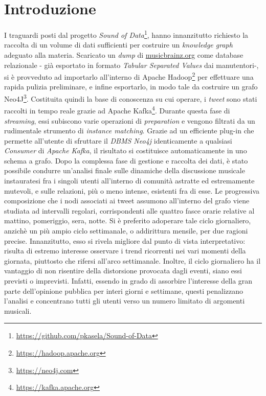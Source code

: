 \documentclass[12pt, a4paper, twocolumn]{article} %
\begin{document}
\part{Introduzione}
I traguardi posti dal progetto \textit{Sound of Data}\footnote{\url{https://github.com/pkasela/Sound-of-Data}}, hanno innanzitutto richiesto la raccolta di un volume di dati sufficienti per costruire un \textit{knowledge graph} adeguato alla materia. Scaricato un \textit{dump} di \url{musicbrainz.org} come database relazionale - già esportato in formato \textit{Tabular Separated Values} dai manutentori-, si è provveduto ad importarlo all'interno di Apache Hadoop\footnote{\url{https://hadoop.apache.org}} per effettuare una rapida pulizia preliminare, e infine esportarlo, in modo tale da costruire un grafo Neo4J\footnote{\url{https://neo4j.com}}.
Costituita quindi la base di conoscenza su cui operare, i \textit{tweet} sono stati raccolti in tempo reale grazie ad Apache Kafka\footnote{\url{https://kafka.apache.org}}. Durante questa fase di \textit{streaming}, essi subiscono varie operazioni di \textit{preparation} e vengono filtrati da un rudimentale strumento di \textit{instance matching}. Grazie ad un efficiente plug-in che permette all'utente di sfruttare il \textit{DBMS Neo4j} identicamente a qualsiasi \textit{Consumer} di \textit{Apache Kafka}, il risultato si costituisce automaticamente in uno schema a grafo. Dopo la complessa fase di gestione e raccolta dei dati, è stato possibile condurre un'analisi finale sulle dinamiche della discussione musicale instauratesi fra i singoli utenti all'interno di comunità astratte ed estremamente mutevoli, e sulle relazioni, più o meno intense, esistenti fra di esse. Le progressiva composizione che i nodi associati ai tweet assumono all'interno del grafo viene studiata ad intervalli regolari, corrispondenti alle quattro fasce orarie relative al mattino, pomeriggio, sera, notte. Si è preferito adoperare tale ciclo giornaliero, anzichè un più ampio ciclo settimanale, o addirittura mensile, per due ragioni precise. Innanzitutto, esso si rivela migliore dal punto di vista interpretativo: risulta di estremo interesse osservare i trend ricorrenti nei vari momenti della giornata, piuttosto che rifersi all'arco settimanale. Inoltre, il ciclo giornaliero ha il vantaggio di non risentire della distorsione provocata dagli eventi, siano essi previsti o imprevisti. Infatti, essendo in grado di assorbire l'interesse della gran parte dell'opinione pubblica per interi giorni e settimane, questi penalizzano l'analisi e concentrano tutti gli utenti verso un numero limitato di argomenti musicali.\ 
\end{document}
